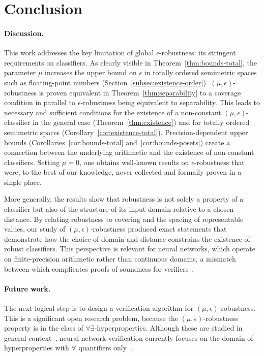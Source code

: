 \section{Conclusion}

\paragraph{Discussion.} This work addresses the key limitation of global $\epsilon$-robustness: its stringent requirements on classifiers. As clearly visible in Theorem~\ref{thm:bounds-total}, the parameter $\mu$ increases the upper bound on $\epsilon$ in totally ordered semimetric spaces such as floating-point numbers (Section~\ref{subsec:existence-order}). $(\mu,\epsilon)$-robustness is proven equivalent in Theorem~\ref{thm:separability} to a coverage condition in parallel to $\epsilon$-robustness being equivalent to separability. This leads to necessary and sufficient conditions for the existence of a non-constant $(\mu, \epsilon)$-classifier in the general case (Theorem~\ref{thm:existence}) and for totally ordered semimetric spaces (Corollary~\ref{cor:existence-total}). Precision-dependent upper bounds (Corollaries~\ref{cor:bounds-total} and~\ref{cor:bounds-posets}) create a connection between the underlying arithmetic and the existence of non-constant classifiers. Setting $\mu = 0$, one obtains well-known results on $\epsilon$-robustness that were, to the best of our knowledge, never collected and formally proven in a single place.

More generally, the results show that robustness is not solely a property of a classifier but also of the structure of its input domain relative to a chosen distance. By relating robustness to covering and the spacing of representable values, our study of $(\mu,\epsilon)$-robustness produced exact statements that demonstrate how the choice of domain and distance constrains the existence of robust classifiers. This perspective is relevant for neural networks, which operate on finite-precision arithmetic rather than continuous domains, a mismatch between which complicates proofs of soundness for verifiers~\cite{jia2021exploiting,cordeiro2025neural}.

\paragraph{Future work.} The next logical step is to design a verification algorithm for $(\mu,\epsilon)$-robustness. This is a significant open research problem, because the $(\mu,\epsilon)$-robustness property is in the class of $\forall\exists$-hyperproperties. Although these are studied in general context~\cite{correnson2024finding,correnson2025symbolic,finkbeiner2026concurrent}, neural network verification currently focuses on the domain of hyperproperties with $\forall$ quantifiers only~\cite{athavale2024verifying,aleksandrov2026rocq,boetius2023verifying}.
